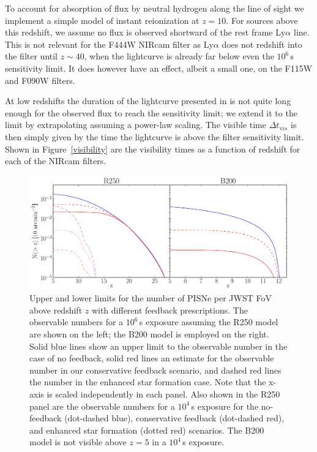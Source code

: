\documentclass{thesis}
\newcommand{\RefFig}[1]{\mbox{Figure~\ref{#1}}}
\begin{document}
To account for absorption of flux by neutral hydrogen along the line
of sight we implement a simple model of instant reionization at
$z=10$.  For sources above this redshift, we assume no flux is
observed shortward of the rest frame Ly$\alpha$ line.  This is not
relevant for the F444W NIRcam filter as Ly$\alpha$ does not redshift
into the filter until $z\sim40$, when the lightcurve is already far
below even the $10^6\,$s sensitivity limit.  It does however have an
effect, albeit a small one, on the F115W and F090W filters.

At low redshifts the duration of the lightcurve presented in
\citet{KasenWoosleyHeger2011} is not quite long enough for the
observed flux to reach the sensitivity limit; we extend it to the
limit by extrapolating assuming a power-law scaling.  The visible time
$\Delta t_{\mathrm vis}$ is then simply given by the time the lightcurve
is above the filter sensitivity limit.  Shown in \RefFig{visibility}
are the visibility times as a function of redshift for each of the
NIRcam filters.  

\begin{figure}
 \begin{center}
   \includegraphics[width=\columnwidth]{observableNumber}
   \caption{Upper and lower limits for the number of
     PISNe per JWST FoV above redshift $z$ with different feedback
     prescriptions. The observable numbers for a $10^6\,$s exposure
     assuming the R250 model are shown on the left; the B200 model is
     employed on the right. Solid blue lines show an upper limit to
     the observable number in the case of no feedback, solid red lines
     an estimate for the observable number in our conservative
     feedback scenario, and dashed red lines the number in the
     enhanced star formation case. Note that the x-axis is scaled
     independently in each panel.  Also shown in the R250 panel are
     the observable numbers for a $10^4\,$s exposure for the
     no-feedback (dot-dashed blue), conservative feedback (dot-dashed
     red), and enhanced star formation (dotted red) scenarios. The
     B200 model is not visible above $z=5$ in a $10^4\,$s exposure.}
   \label{obsnumber}
 \end{center}
\end{figure} 
\end{document}
